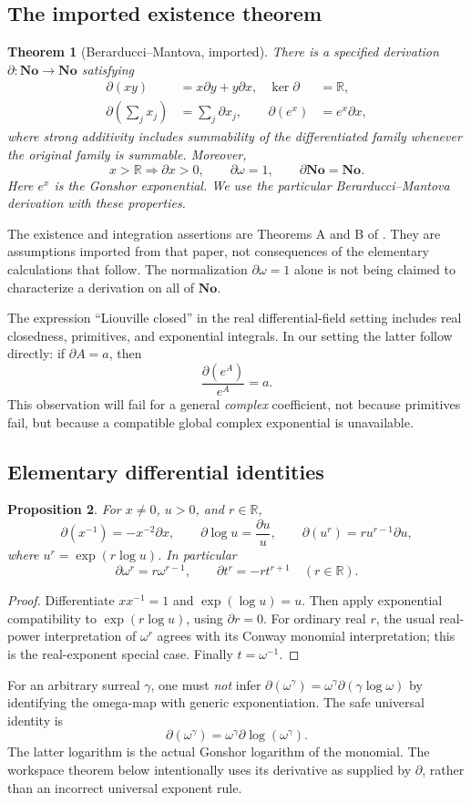 \documentclass[11pt,a4paper]{article}
\newtheorem{theorem}{Theorem}[section]
\newtheorem{proposition}[theorem]{Proposition}
\theoremstyle{definition}
\newcommand{\No}{\mathbf{No}}
\newcommand{\R}{\mathbb R}
\newcommand{\D}{\partial}
\DeclareMathOperator{\Ker}{ker}
\numberwithin{equation}{section}
\begin{document}
\subsection{The imported existence theorem}
\begin{theorem}[Berarducci--Mantova, imported]\label{thm:BM}
There is a specified derivation $\D:\No\to\No$ satisfying
\begin{align*}
 \D(xy)&=x\D y+y\D x, & \Ker\D&=\R,\\
 \D\!\left(\sum_j x_j\right)&=\sum_j\D x_j,
 & \D(e^x)&=e^x\D x,
\end{align*}
where strong additivity includes summability of the differentiated family
whenever the original family is summable. Moreover,
\[
 x>\R\Longrightarrow\D x>0,\qquad
 \D\omega=1,\qquad \D\No=\No.
\]
Here $e^x$ is the Gonshor exponential. We use the particular
Berarducci--Mantova derivation with these properties.
\end{theorem}
The existence and integration assertions are Theorems A and B of
\cite{BM}. They are assumptions imported from that paper, not consequences
of the elementary calculations that follow. The normalization
$\D\omega=1$ alone is not being claimed to characterize a derivation on
all of $\No$.

The expression ``Liouville closed'' in the real differential-field setting
includes real closedness, primitives, and exponential integrals. In our
setting the latter follow directly: if $\D A=a$, then
\begin{equation}\label{eq:realexpintegral}
 \frac{\D(e^A)}{e^A}=a.
\end{equation}
This observation will fail for a general \emph{complex} coefficient, not
because primitives fail, but because a compatible global complex
exponential is unavailable.

\subsection{Elementary differential identities}
\begin{proposition}\label{prop:calculus}
For $x\ne0$, $u>0$, and $r\in\R$,
\[
 \D(x^{-1})=-x^{-2}\D x,\qquad
 \D\log u=\frac{\D u}{u},\qquad
 \D(u^r)=r u^{r-1}\D u,
\]
where $u^r=\exp(r\log u)$. In particular
\[
 \D\omega^r=r\omega^{r-1},\qquad
 \D t^r=-r t^{r+1}\quad(r\in\R).
\]
\end{proposition}
\begin{proof}
Differentiate $xx^{-1}=1$ and $\exp(\log u)=u$. Then apply exponential
compatibility to $\exp(r\log u)$, using $\D r=0$. For ordinary real $r$,
the usual real-power interpretation of $\omega^r$ agrees with its Conway
monomial interpretation; this is the real-exponent special case. Finally
$t=\omega^{-1}$.
\end{proof}
For an arbitrary surreal $\gamma$, one must \emph{not} infer
$\D(\omega^\gamma)=\omega^\gamma\D(\gamma\log\omega)$ by identifying the
omega-map with generic exponentiation. The safe universal identity is
\[
 \D(\omega^\gamma)=\omega^\gamma\D\log(\omega^\gamma).
\]
The latter logarithm is the actual Gonshor logarithm of the monomial. The
workspace theorem below intentionally uses its derivative as supplied by
$\D$, rather than an incorrect universal exponent rule.
\end{document}
